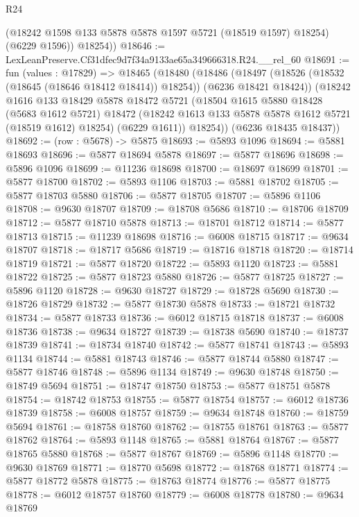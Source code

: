 \begin{lexlean}{R24}
\begin{coremodule}
          (@18242 @1598 @133 @5878 @5878 @1597 @5721 (@18519 @1597) @18254)
          (@6229 @1596))
        @18254))
@18646 := LexLeanPreserve.Cf31dfec9d7f34a9133ae65a349666318.R24.__rel_60
@18691 := fun (values : @17829) =>
  @18465
    (@18480
      (@18486
        (@18497 (@18526 (@18532 (@18645 (@18646 @18412 @18414)) @18254)) (@6236 @18421 @18424))
        (@18242
          @1616
          @133
          @18429
          @5878
          @18472
          @5721
          (@18504
            @1615
            @5880
            @18428
            (@5683 @1612 @5721)
            @18472
            (@18242 @1613 @133 @5878 @5878 @1612 @5721 (@18519 @1612) @18254)
            (@6229 @1611))
          @18254))
      (@6236 @18435 @18437))
@18692 := (row : @5678) -> @5875
@18693 := @5893 @1096
@18694 := @5881 @18693
@18696 := @5877 @18694 @5878
@18697 := @5877 @18696
@18698 := @5896 @1096
@18699 := @11236 @18698
@18700 := @18697 @18699
@18701 := @5877 @18700
@18702 := @5893 @1106
@18703 := @5881 @18702
@18705 := @5877 @18703 @5880
@18706 := @5877 @18705
@18707 := @5896 @1106
@18708 := @9630 @18707
@18709 := @18708 @5686
@18710 := @18706 @18709
@18712 := @5877 @18710 @5878
@18713 := @18701 @18712
@18714 := @5877 @18713
@18715 := @11239 @18698
@18716 := @6008 @18715
@18717 := @9634 @18707
@18718 := @18717 @5686
@18719 := @18716 @18718
@18720 := @18714 @18719
@18721 := @5877 @18720
@18722 := @5893 @1120
@18723 := @5881 @18722
@18725 := @5877 @18723 @5880
@18726 := @5877 @18725
@18727 := @5896 @1120
@18728 := @9630 @18727
@18729 := @18728 @5690
@18730 := @18726 @18729
@18732 := @5877 @18730 @5878
@18733 := @18721 @18732
@18734 := @5877 @18733
@18736 := @6012 @18715 @18718
@18737 := @6008 @18736
@18738 := @9634 @18727
@18739 := @18738 @5690
@18740 := @18737 @18739
@18741 := @18734 @18740
@18742 := @5877 @18741
@18743 := @5893 @1134
@18744 := @5881 @18743
@18746 := @5877 @18744 @5880
@18747 := @5877 @18746
@18748 := @5896 @1134
@18749 := @9630 @18748
@18750 := @18749 @5694
@18751 := @18747 @18750
@18753 := @5877 @18751 @5878
@18754 := @18742 @18753
@18755 := @5877 @18754
@18757 := @6012 @18736 @18739
@18758 := @6008 @18757
@18759 := @9634 @18748
@18760 := @18759 @5694
@18761 := @18758 @18760
@18762 := @18755 @18761
@18763 := @5877 @18762
@18764 := @5893 @1148
@18765 := @5881 @18764
@18767 := @5877 @18765 @5880
@18768 := @5877 @18767
@18769 := @5896 @1148
@18770 := @9630 @18769
@18771 := @18770 @5698
@18772 := @18768 @18771
@18774 := @5877 @18772 @5878
@18775 := @18763 @18774
@18776 := @5877 @18775
@18778 := @6012 @18757 @18760
@18779 := @6008 @18778
@18780 := @9634 @18769

\end{coremodule}
\end{lexlean}
